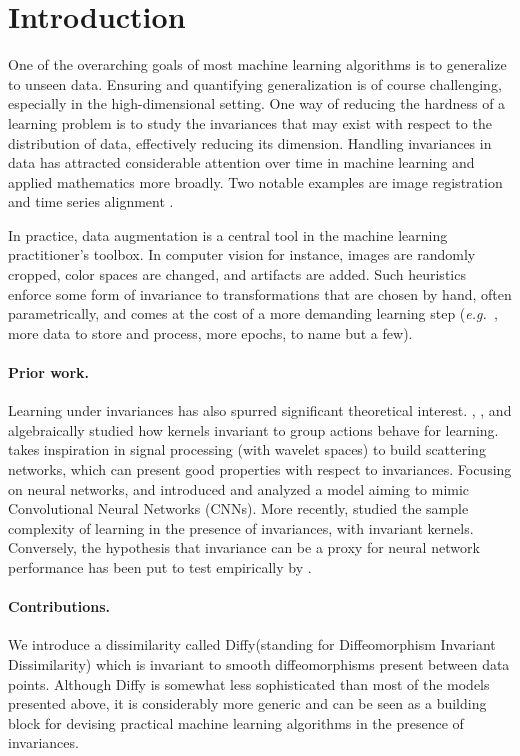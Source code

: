 \newcommand{\Diffy}{Diffy\xspace}



\section{Introduction}
One of the overarching goals of most machine learning algorithms is to generalize to unseen data. Ensuring and quantifying generalization is of course challenging, especially in the high-dimensional setting. One way of reducing the hardness of a learning problem is to study the invariances that may exist with respect to the distribution of data, effectively reducing its dimension. Handling invariances in data has attracted considerable attention over time in machine learning and applied mathematics more broadly. Two notable examples are image registration \citep{registration1,registration2} and time series alignment \citep{dtw,soft-dtw,vayer,diff-dtw,align-incomparable}.

In practice, data augmentation is a central tool in the machine learning practitioner's toolbox. In computer vision for instance, images are randomly cropped, color spaces are changed, and artifacts are added. Such heuristics enforce some form of invariance to transformations that are chosen by hand, often parametrically, and comes at the cost of a more demanding learning step (\emph{e.g.\ }, more data to store and process, more epochs, to name but a few).
\paragraph{Prior work.}
Learning under invariances has also spurred significant theoretical interest.
\citet{decoste2002training}, \citet{haasdonk2007invariant}, \citet{kondor2008group} and \citet{mroueh2015} algebraically studied how kernels invariant to group actions behave for learning. \citet{bruna2013invariant} takes inspiration in signal processing (with wavelet spaces) to build scattering networks, which can present good properties with respect to invariances. Focusing on neural networks, \citet{CKN} and \citet{CKNInvariance} introduced and analyzed a model aiming to mimic Convolutional Neural Networks (CNNs). More recently, \citet{bietti2021} studied the sample complexity of learning in the presence of invariances, with invariant kernels. Conversely, the hypothesis that invariance can be a proxy for neural network performance has been put to test empirically by \citet{wyartdiffeo}.

\paragraph{Contributions.}
We introduce a dissimilarity called \Diffy (standing for Diffeomorphism Invariant Dissimilarity) which is invariant to smooth diffeomorphisms present between data points. Although \Diffy is somewhat less sophisticated than most of the models presented above, it is considerably more generic and can be seen as a building block for devising practical machine learning algorithms in the presence of invariances.

